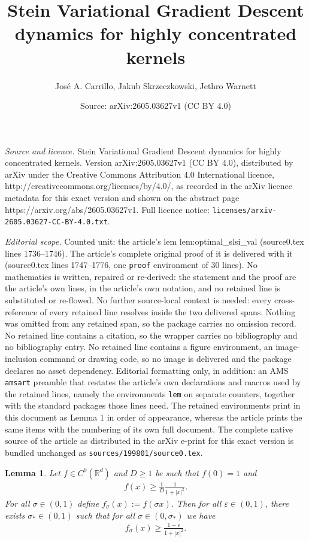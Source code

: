 \documentclass[10pt,a4paper]{amsart}
\title{Stein Variational Gradient Descent dynamics for highly concentrated kernels}
\author{Jos\'e A. Carrillo, Jakub Skrzeczkowski, Jethro Warnett}
\date{Source: arXiv:2605.03627v1 (CC BY 4.0)}
\newtheorem{lem}{Lemma}
\begin{document}
\maketitle

\noindent\emph{Source and licence.} Stein Variational Gradient Descent dynamics for highly concentrated kernels. Version arXiv:2605.03627v1 (CC BY 4.0), distributed by arXiv under the Creative Commons Attribution 4.0 International licence, http://creativecommons.org/licenses/by/4.0/, as recorded in the arXiv licence metadata for this exact version and shown on the abstract page https://arxiv.org/abs/2605.03627v1. Full licence notice: \texttt{licenses/arxiv-2605.03627-CC-BY-4.0.txt}.\par\smallskip

\noindent\textit{Editorial scope.} Counted unit: the article's lem lem:optimal\_slsi\_val (source0.tex lines 1736--1746). The article's complete original proof of it is delivered with it (source0.tex lines 1747--1776, one \texttt{proof} environment of 30 lines). No mathematics is written, repaired or re-derived: the statement and the proof are the article's own lines, in the article's own notation, and no retained line is substituted or re-flowed.  No further source-local context is needed: every cross-reference of every retained line resolves inside the two delivered spans.  Nothing was omitted from any retained span, so the package carries no omission record.  No retained line contains a citation, so the wrapper carries no bibliography and no bibliography entry.  No retained line contains a figure environment, an image-inclusion command or drawing code, so no image is delivered and the package declares no asset dependency.  Editorial formatting only, in addition: an AMS \texttt{amsart} preamble that restates the article's own declarations and macros used by the retained lines, namely the environments \texttt{lem} on separate counters, together with the standard packages those lines need.  The retained environments print in this document as Lemma 1 in order of appearance, whereas the article prints the same items with the numbering of its own full document.  The complete native source of the article as distributed in the arXiv e-print for this exact version is bundled unchanged as \texttt{sources/199801/source0.tex}.
\begin{lem}
    \label{lem:optimal_slsi_val}
    Let $f\in C^0(\mathbb{R}^{d})$ and $D\geq 1$ be such that $f(0)=1$ and
    \begin{align*}
        f(x)\geq \frac{1}{D}\frac{1}{1+|x|^2}.
    \end{align*}
    For all $\sigma\in (0,1)$ define $f_\sigma(x):=f(\sigma x)$. Then for all $\varepsilon\in (0,1)$, there exists $\sigma_\ast\in (0,1)$ such that for all $\sigma\in (0,\sigma_\ast)$ we have
    \begin{align*}
        f_\sigma(x)\geq \frac{1-\varepsilon}{1+|x|^2}.
    \end{align*}
\end{lem}
\end{document}
